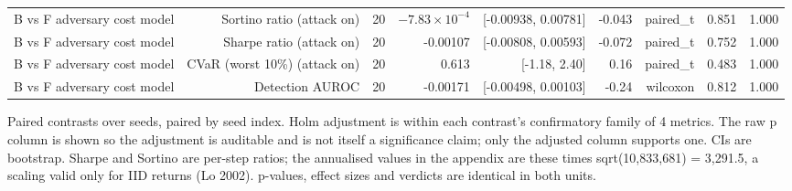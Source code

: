 \begin{table}[htbp]
\begin{tabular}{lrrrrrrrr}
    B vs F   adversary cost model & Sortino ratio (attack on) & 20 & $-7.83\times10^{-4}$ & [-0.00938, 0.00781] & -0.043 & paired\_t & 0.851 & 1.000 \\
    B vs F   adversary cost model & Sharpe ratio (attack on) & 20 & -0.00107 & [-0.00808, 0.00593] & -0.072 & paired\_t & 0.752 & 1.000 \\
    B vs F   adversary cost model & CVaR (worst 10\%) (attack on) & 20 & 0.613 & [-1.18, 2.40] & 0.16 & paired\_t & 0.483 & 1.000 \\
    B vs F   adversary cost model & Detection AUROC & 20 & -0.00171 & [-0.00498, 0.00103] & -0.24 & wilcoxon & 0.812 & 1.000 \\
    \bottomrule
  \end{tabular}
  \begin{minipage}{\linewidth}\vspace{4pt}\footnotesize Paired contrasts over seeds, paired by seed index. Holm adjustment is within each contrast's confirmatory family of 4 metrics. The raw p column is shown so the adjustment is auditable and is not itself a significance claim; only the adjusted column supports one. CIs are bootstrap. Sharpe and Sortino are per-step ratios; the annualised values in the appendix are these times sqrt(10,833,681) = 3,291.5, a scaling valid only for IID returns (Lo 2002). p-values, effect sizes and verdicts are identical in both units.\end{minipage}
\end{table}
